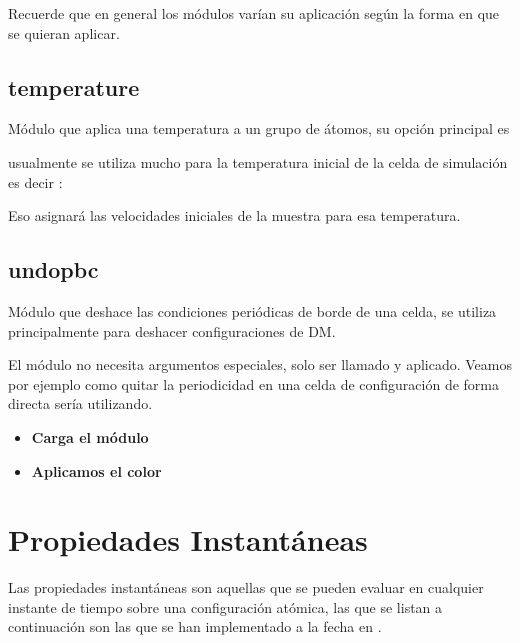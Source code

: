 
Recuerde que en general los m\'odulos var\'ian su aplicaci\'on seg\'un la forma en que se quieran aplicar.

\subsection{temperature}
M\'odulo que aplica una temperatura a un grupo de \'atomos, su opci\'on principal es


usualmente se utiliza mucho para la temperatura inicial de la celda de simulaci\'on es decir :


Eso asignar\'a las velocidades iniciales de la muestra para esa temperatura.

\subsection{undopbc}
M\'odulo que deshace las condiciones peri\'odicas de borde de una celda, se utiliza principalmente para deshacer configuraciones de DM.

El m\'odulo no necesita argumentos especiales, solo ser llamado y aplicado. Veamos por ejemplo como quitar la periodicidad en una celda de configuraci\'on de forma directa ser\'ia utilizando.

\begin{itemize}
 \item \textbf{Carga el m\'odulo}
 \item \textbf{Aplicamos el color}
\end{itemize}


\section{Propiedades Instant\'aneas}
Las propiedades instant\'aneas son aquellas que se pueden evaluar en cualquier instante de tiempo sobre una configuraci\'on at\'omica, las que se listan a continuaci\'on son las que se han implementado a la fecha en {\lpmd}.

